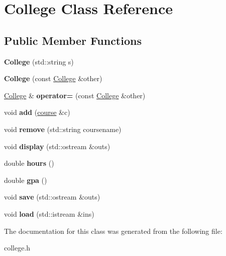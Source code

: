 \hypertarget{class_college}{}\section{College Class Reference}
\label{class_college}
\subsection*{Public Member Functions}
\begin{DoxyCompactItemize}
\item 
\mbox{\label{class_college_adabaf4087355e83f9f7d39f1e1498b41}} 
{\bfseries College} (std\+::string s)
\item 
\mbox{\label{class_college_ad007ad488e5a7ef986114080d0c8e101}} 
{\bfseries College} (const \mbox{\hyperlink{class_college}{College}} \&other)
\item 
\mbox{\label{class_college_a7958d05135038eb595c8762ef01ef704}} 
\mbox{\hyperlink{class_college}{College}} \& {\bfseries operator=} (const \mbox{\hyperlink{class_college}{College}} \&other)
\item 
\mbox{\label{class_college_a67fd1d8970b46b24ce2e0dd72598a22f}} 
void {\bfseries add} (\mbox{\hyperlink{classcourse}{course}} \&c)
\item 
\mbox{\label{class_college_a4d2ae513b36e6421fb1ca2c08459cfe6}} 
void {\bfseries remove} (std\+::string coursename)
\item 
\mbox{\label{class_college_a52ca0a164483cf5c05591cd0fb8b300c}} 
void {\bfseries display} (std\+::ostream \&outs)
\item 
\mbox{\label{class_college_a8a7a762611a1d7e00c453390d49355fd}} 
double {\bfseries hours} ()
\item 
\mbox{\label{class_college_aaf9bfaa0bc717e96da6365661a96fcd0}} 
double {\bfseries gpa} ()
\item 
\mbox{\label{class_college_af6b419f813bc990c0e11f99b78a26899}} 
void {\bfseries save} (std\+::ostream \&outs)
\item 
\mbox{\label{class_college_a11422094ddd907705daede7aa537dd73}} 
void {\bfseries load} (std\+::istream \&ins)
\end{DoxyCompactItemize}


The documentation for this class was generated from the following file\+:\begin{DoxyCompactItemize}
\item 
college.\+h\end{DoxyCompactItemize}
